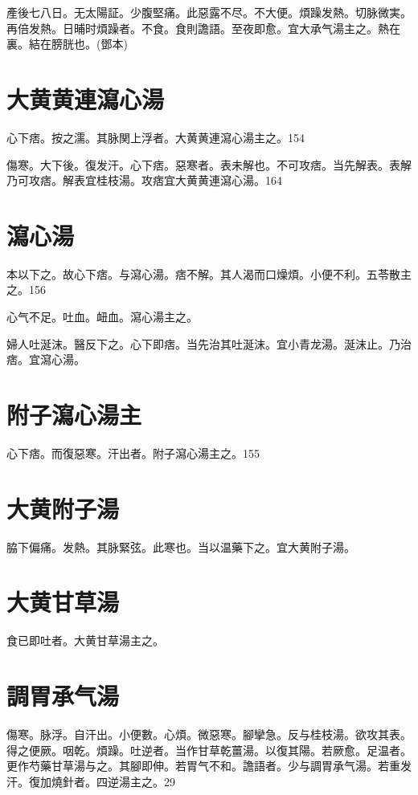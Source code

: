 \documentclass[b5paper,twoside,zihao=-4,UTF8]{ctexbook}
\begin{document}
產後七八日。无太陽証。少腹堅痛。此惡露不尽。不大便。煩躁发熱。切脉微実。再倍发熱。日晡时煩躁者。不食。食則譫語。至夜即愈。宜大承气湯主之。熱在裏。結在膀胱也。(鄧本)

\section{大黄黄連瀉心湯}

心下痞。按之濡。其脉関上浮者。大黄{黄連}瀉心湯主之。154

傷寒。大下後。復发汗。心下痞。惡寒者。表未解也。不可攻痞。当先解表。表解乃可攻痞。解表宜桂枝湯。攻痞宜大黄黄連瀉心湯。164

\section{瀉心湯}

本以下之。故心下痞。与瀉心湯。痞不解。其人渴而口燥{煩}。小便不利。五苓散主之。156

心气不足。吐血。衄血。瀉心湯主之。

婦人吐涎沫。醫反下之。心下即痞。当先治其吐涎沫。宜小青龙湯。涎沫止。乃治痞。宜瀉心湯。

\section{附子瀉心湯主}

心下痞。而復惡寒。汗出者。附子瀉心湯主之。155

\section{大黄附子湯}

脇下偏痛。{发熱。}其脉緊弦。此寒也。{当}以温藥下之。宜大黄附子湯。

\section{大黄甘草湯}

食已即吐者。大黄甘草湯主之。

\section{調胃承气湯}

傷寒。脉浮。自汗出。小便數。心煩。微惡寒。腳攣急。反与桂枝湯。欲攻其表。得之便厥。咽乾。煩躁。吐逆者。当作甘草乾薑湯。以復其陽。若厥愈。足温者。更作芍藥甘草湯与之。其腳即伸。若胃气不和。譫語者。少与{調胃}承气湯。若重发汗。復加燒針者。四逆湯主之。29
\end{document}
